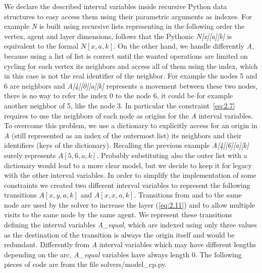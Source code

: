 \documentclass[12pt, a4paper, hidelinks]{article}
\numberwithin{equation}{section}
\begin{document}
We declare the described interval variables inside recursive Python data structures to easy access them using their parametric arguments as indexes.
For example \textit{N} is built using recursive lists representing in the following order the vertex, agent and layer dimensions, follows that the Pythonic \textit{N[x][a][k]} is equivalent to the formal $N[x,a,k]$.
On the other hand, we handle differently \textit{A}, because using a list of list is correct until the wanted operations are limited on cycling for each vertex its neighbors and access all of them using the index, which in this case is not the real identifier of the neighbor.
For example the nodes 5 and 6 are neighbors and \textit{A[4][0][a][k]} represents a movement between these two nodes, there is no way to refer the index 0 to the node 6, it could be for example another neighbor of 5, like the node 3.
In particular the constraint~\ref{eq:2.7} requires to use the neighbors of each node as origins for the \textit{A} interval variables.
To overcome this problem, we use a dictionary to explicitly access for an origin in \textit{A} (still represented as an index of the outermost list) its neighbors and their identifiers (keys of the dictionary).
Recalling the previous example \textit{A[4][6][a][k]} surely represents $A[5,6,a,k]$.
Probably substituting also the outer list with a dictionary would lead to a more clear model, but we decide to keep it for legacy with the other interval variables.
In order to simplify the implementation of some constraints we created two different interval variables to represent the following transitions $A[x,y,a,k]$ and $A[x,x,a,k]$.
Transitions from and to the same node are used by the solver to increase the layer (\ref{eq:2.11}) and to allow multiple visits to the same node by the same agent.
We represent these transitions defining the interval variables \textit{A\_equal}, which are indexed using only three values as the destination of the transition is always the origin itself and would be redundant.
Differently from \textit{A} interval variables which may have different lengths depending on the arc, \textit{A\_equal} variables have always length 0.
The following pieces of code are from the file solvers/model\_cp.py.
\end{document}
